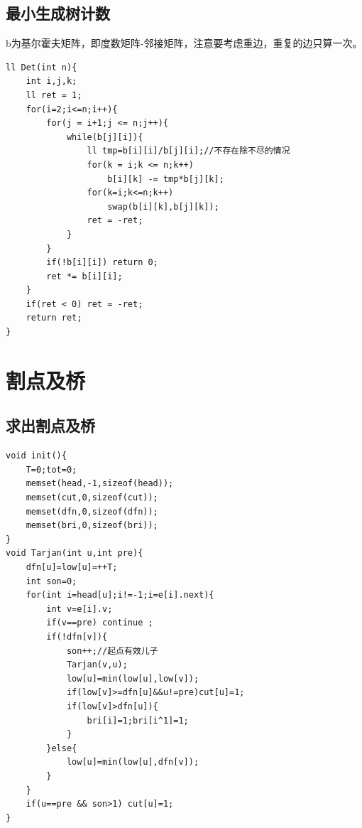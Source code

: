 \documentclass[a4paper,11pt,twoside,fontset = fandol,UTF8]{ctexbook} %
\begin{document}
	\subsection{最小生成树计数}
	b为基尔霍夫矩阵，即度数矩阵-邻接矩阵，注意要考虑重边，重复的边只算一次。
	\begin{lstlisting}
ll Det(int n){
    int i,j,k;
    ll ret = 1;
    for(i=2;i<=n;i++){
        for(j = i+1;j <= n;j++){
            while(b[j][i]){
                ll tmp=b[i][i]/b[j][i];//不存在除不尽的情况 
                for(k = i;k <= n;k++)
                    b[i][k] -= tmp*b[j][k];
                for(k=i;k<=n;k++)
                    swap(b[i][k],b[j][k]);  
                ret = -ret;
            }
        }
        if(!b[i][i]) return 0;
        ret *= b[i][i];
    }
    if(ret < 0) ret = -ret;
    return ret;
}
	\end{lstlisting}
	\section{割点及桥}
	\subsection{求出割点及桥}
	\begin{lstlisting}
void init(){
    T=0;tot=0;
    memset(head,-1,sizeof(head));
    memset(cut,0,sizeof(cut));
    memset(dfn,0,sizeof(dfn));
    memset(bri,0,sizeof(bri));
}
void Tarjan(int u,int pre){
    dfn[u]=low[u]=++T;
    int son=0;
    for(int i=head[u];i!=-1;i=e[i].next){
        int v=e[i].v;
        if(v==pre) continue ;
        if(!dfn[v]){
            son++;//起点有效儿子
            Tarjan(v,u);
            low[u]=min(low[u],low[v]);
            if(low[v]>=dfn[u]&&u!=pre)cut[u]=1;
            if(low[v]>dfn[u]){
                bri[i]=1;bri[i^1]=1;
            }
        }else{
            low[u]=min(low[u],dfn[v]);
        }
    }
    if(u==pre && son>1) cut[u]=1;
}
	\end{lstlisting}
\end{document}
